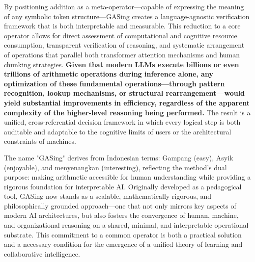 \documentclass[11pt,a4paper]{article}
\begin{document}
By positioning addition as a meta-operator—capable of expressing the meaning of any symbolic token structure—GASing creates a language-agnostic verification framework that is both interpretable and measurable. This reduction to a core operator allows for direct assessment of computational and cognitive resource consumption, transparent verification of reasoning, and systematic arrangement of operations that parallel both transformer attention mechanisms and human chunking strategies. \textbf{Given that modern LLMs execute billions or even trillions of arithmetic operations during inference alone, any optimization of these fundamental operations—through pattern recognition, lookup mechanisms, or structural rearrangement—would yield substantial improvements in efficiency, regardless of the apparent complexity of the higher-level reasoning being performed.} The result is a unified, cross-referential decision framework in which every logical step is both auditable and adaptable to the cognitive limits of users or the architectural constraints of machines.

The name "GASing" derives from Indonesian terms: Gampang (easy), Asyik (enjoyable), and menyenangkan (interesting), reflecting the method’s dual purpose: making arithmetic accessible for human understanding while providing a rigorous foundation for interpretable AI. Originally developed as a pedagogical tool, GASing now stands as a scalable, mathematically rigorous, and philosophically grounded approach—one that not only mirrors key aspects of modern AI architectures, but also fosters the convergence of human, machine, and organizational reasoning on a shared, minimal, and interpretable operational substrate. This commitment to a common operator is both a practical solution and a necessary condition for the emergence of a unified theory of learning and collaborative intelligence.
\end{document}
